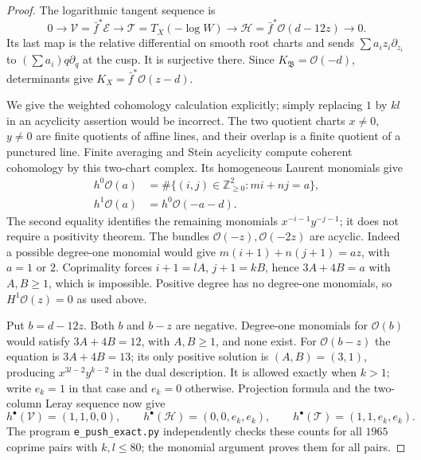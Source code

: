 \begin{proof}
The logarithmic tangent sequence is
\[
 0\longrightarrow\mathcal V=\bar f^*\mathcal E
 \longrightarrow\mathcal T=T_X(-\log W)
 \longrightarrow\mathcal H=\bar f^*\mathcal O(d-12z)
 \longrightarrow0.
\]
Its last map is the relative differential on smooth root charts
and sends $\sum a_i z_i\partial_{z_i}$ to
$(\sum a_i)q\partial_q$ at the cusp.  It is surjective there.
Since $K_{\mathfrak B}=\mathcal O(-d)$, determinants give
$K_X=\bar f^*\mathcal O(z-d)$.

We give the weighted cohomology calculation explicitly; simply
replacing $1$ by $kl$ in an acyclicity assertion would be incorrect.
The two quotient charts $x\ne0$, $y\ne0$ are finite quotients
of affine lines, and their overlap is a finite quotient of a
punctured line.  Finite averaging and Stein acyclicity compute
coherent cohomology by this two-chart complex.  Its homogeneous
Laurent monomials give
\[
 \begin{split}
 h^0\mathcal O(a)&=\#\{(i,j)\in\mathbb Z_{\ge0}^2:mi+nj=a\},\\
 h^1\mathcal O(a)&=h^0\mathcal O(-a-d).
 \end{split}
\]
The second equality identifies the remaining monomials
$x^{-i-1}y^{-j-1}$; it does not require a positivity theorem.
The bundles $\mathcal O(-z),\mathcal O(-2z)$ are acyclic.
Indeed a possible degree-one monomial would give
$m(i+1)+n(j+1)=az$, with $a=1$ or $2$.
Coprimality forces $i+1=lA$, $j+1=kB$, hence
$3A+4B=a$ with $A,B\ge1$, which is impossible.
Positive degree has no degree-one monomials, so
$H^1\mathcal O(z)=0$ as used above.

Put $b=d-12z$.  Both $b$ and $b-z$ are negative.
Degree-one monomials for $\mathcal O(b)$ would satisfy
$3A+4B=12$, with $A,B\ge1$, and none exist.
For $\mathcal O(b-z)$ the equation is $3A+4B=13$;
its only positive solution is $(A,B)=(3,1)$, producing
$x^{3l-2}y^{k-2}$ in the dual description.  It is allowed
exactly when $k>1$; write $e_k=1$ in that case and $e_k=0$
otherwise.  Projection formula and the two-column Leray sequence
now give
\[
 h^\bullet(\mathcal V)=(1,1,0,0),\qquad
 h^\bullet(\mathcal H)=(0,0,e_k,e_k),\qquad
 h^\bullet(\mathcal T)=(1,1,e_k,e_k).
\]
The program \texttt{e\_push\_exact.py} independently checks these
counts for all $1965$ coprime pairs with $k,l\le80$; the monomial
argument proves them for all pairs.


\end{proof}
